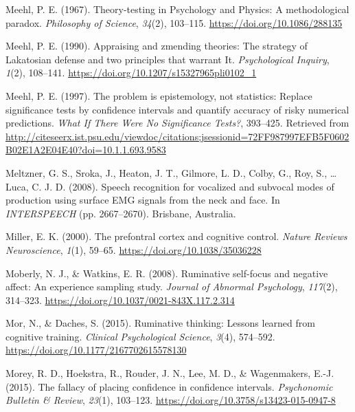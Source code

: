 \documentclass[a4paper,12pt,twoside,onecolumn,openright,final,oldfontcommands]{memoir}
\begin{document}
\leavevmode\hypertarget{ref-meehl_theory-testing_1967}{}%
Meehl, P. E. (1967). Theory-testing in Psychology and Physics: A methodological paradox. \emph{Philosophy of Science}, \emph{34}(2), 103--115. \url{https://doi.org/10.1086/288135}

\leavevmode\hypertarget{ref-meehl_appraising_1990}{}%
Meehl, P. E. (1990). Appraising and zmending theories: The strategy of Lakatosian defense and two principles that warrant It. \emph{Psychological Inquiry}, \emph{1}(2), 108--141. \url{https://doi.org/10.1207/s15327965pli0102_1}

\leavevmode\hypertarget{ref-harlow_problem_1997}{}%
Meehl, P. E. (1997). The problem is epistemology, not statistics: Replace significance tests by confidence intervals and quantify accuracy of risky numerical predictions. \emph{What If There Were No Significance Tests?}, 393--425. Retrieved from \url{http://citeseerx.ist.psu.edu/viewdoc/citations;jsessionid=72FF987997EFB5F0602B02E1A2E04E40?doi=10.1.1.693.9583}

\leavevmode\hypertarget{ref-meltzner_speech_2008}{}%
Meltzner, G. S., Sroka, J., Heaton, J. T., Gilmore, L. D., Colby, G., Roy, S., \ldots{} Luca, C. J. D. (2008). Speech recognition for vocalized and subvocal modes of production using surface EMG signals from the neck and face. In \emph{INTERSPEECH} (pp. 2667--2670). Brisbane, Australia.

\leavevmode\hypertarget{ref-miller_prefontral_2000}{}%
Miller, E. K. (2000). The prefontral cortex and cognitive control. \emph{Nature Reviews Neuroscience}, \emph{1}(1), 59--65. \url{https://doi.org/10.1038/35036228}

\leavevmode\hypertarget{ref-Moberly2008}{}%
Moberly, N. J., \& Watkins, E. R. (2008). Ruminative self-focus and negative affect: An experience sampling study. \emph{Journal of Abnormal Psychology}, \emph{117}(2), 314--323. \url{https://doi.org/10.1037/0021-843X.117.2.314}

\leavevmode\hypertarget{ref-mor_ruminative_2015}{}%
Mor, N., \& Daches, S. (2015). Ruminative thinking: Lessons learned from cognitive training. \emph{Clinical Psychological Science}, \emph{3}(4), 574--592. \url{https://doi.org/10.1177/2167702615578130}

\leavevmode\hypertarget{ref-morey_fallacy_2015}{}%
Morey, R. D., Hoekstra, R., Rouder, J. N., Lee, M. D., \& Wagenmakers, E.-J. (2015). The fallacy of placing confidence in confidence intervals. \emph{Psychonomic Bulletin \& Review}, \emph{23}(1), 103--123. \url{https://doi.org/10.3758/s13423-015-0947-8}
\end{document}
